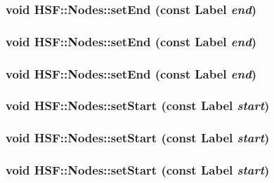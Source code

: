 \label{classHSF_1_1Nodes_a09fe0de278bdddea1c21634e7ade9fed}
\hypertarget{classHSF_1_1Nodes_a7dd80e94f1eae9c903ad4b2797dc0375}{
\subsubsection[{setEnd}]{\setlength{\rightskip}{0pt plus 5cm}void HSF::Nodes::setEnd (const {\bf Label} {\em end})}}
\label{classHSF_1_1Nodes_a7dd80e94f1eae9c903ad4b2797dc0375}
\hypertarget{classHSF_1_1Nodes_a7dd80e94f1eae9c903ad4b2797dc0375}{
\subsubsection[{setEnd}]{\setlength{\rightskip}{0pt plus 5cm}void HSF::Nodes::setEnd (const {\bf Label} {\em end})}}
\label{classHSF_1_1Nodes_a7dd80e94f1eae9c903ad4b2797dc0375}
\hypertarget{classHSF_1_1Nodes_a7dd80e94f1eae9c903ad4b2797dc0375}{
\subsubsection[{setEnd}]{\setlength{\rightskip}{0pt plus 5cm}void HSF::Nodes::setEnd (const {\bf Label} {\em end})}}
\label{classHSF_1_1Nodes_a7dd80e94f1eae9c903ad4b2797dc0375}
\hypertarget{classHSF_1_1Nodes_ab8ee8ad861d256901605c11552e003d4}{
\subsubsection[{setStart}]{\setlength{\rightskip}{0pt plus 5cm}void HSF::Nodes::setStart (const {\bf Label} {\em start})}}
\label{classHSF_1_1Nodes_ab8ee8ad861d256901605c11552e003d4}
\hypertarget{classHSF_1_1Nodes_ab8ee8ad861d256901605c11552e003d4}{
\subsubsection[{setStart}]{\setlength{\rightskip}{0pt plus 5cm}void HSF::Nodes::setStart (const {\bf Label} {\em start})}}
\label{classHSF_1_1Nodes_ab8ee8ad861d256901605c11552e003d4}
\hypertarget{classHSF_1_1Nodes_ab8ee8ad861d256901605c11552e003d4}{
\subsubsection[{setStart}]{\setlength{\rightskip}{0pt plus 5cm}void HSF::Nodes::setStart (const {\bf Label} {\em start})}}
